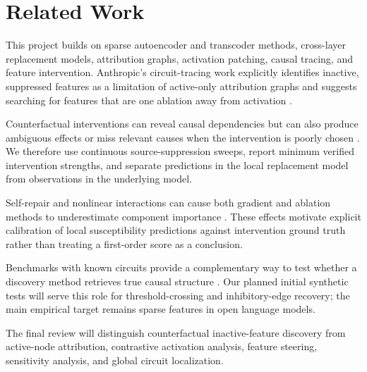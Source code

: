 \section{Related Work}
\label{sec:related}

This project builds on sparse autoencoder and transcoder methods, cross-layer replacement models, attribution graphs, activation patching, causal tracing, and feature intervention. Anthropic's circuit-tracing work explicitly identifies inactive, suppressed features as a limitation of active-only attribution graphs and suggests searching for features that are one ablation away from activation \citep{ameisen2025circuit}.

Counterfactual interventions can reveal causal dependencies but can also produce ambiguous effects or miss relevant causes when the intervention is poorly chosen \citep{mueller2024counterfactuals}. We therefore use continuous source-suppression sweeps, report minimum verified intervention strengths, and separate predictions in the local replacement model from observations in the underlying model.

Self-repair and nonlinear interactions can cause both gradient and ablation methods to underestimate component importance \citep{edin2025gim}. These effects motivate explicit calibration of local susceptibility predictions against intervention ground truth rather than treating a first-order score as a conclusion.

Benchmarks with known circuits provide a complementary way to test whether a discovery method retrieves true causal structure \citep{gupta2024interpbench}. Our planned initial synthetic tests will serve this role for threshold-crossing and inhibitory-edge recovery; the main empirical target remains sparse features in open language models.

The final review will distinguish counterfactual inactive-feature discovery from active-node attribution, contrastive activation analysis, feature steering, sensitivity analysis, and global circuit localization.
